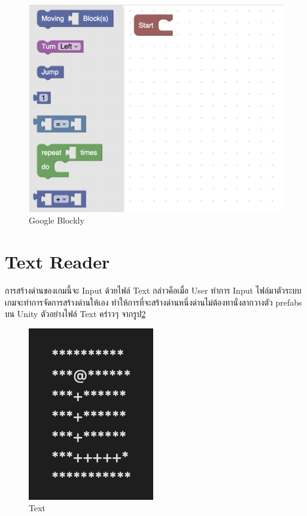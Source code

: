 \begin{figure}
\begin{center}
\includegraphics{pic/block1.jpg}
\end{center}
\caption[Google Blockly]{Google Blockly}
\label{block}
\end{figure}

\section{Text Reader}
การสร้างด่านของเกมนี้จะ Input ด้วยไฟล์ Text กล่าวคือเมื่อ User ทำการ Input ไฟล์มาตัวระบบเกมจะทำการจัดการสร้างด่านให้เอง
ทำให้การที่จะสร้างด่านหนึ่งด่านไม่ต้องทานั่งลากวางตัว prefabs บน Unity ตัวอย่างไฟล์ Text คร่าวๆ จากรูป\ref{txt}
\begin{figure}
    \begin{center}
    \includegraphics{pic/text.png}
    \end{center}
    \caption[Text]{Text}
    \label{txt}
    \end{figure}
